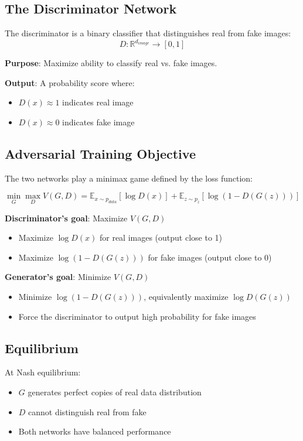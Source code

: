 \documentclass[12pt,a4paper]{article}
\begin{document}
\subsection{The Discriminator Network}

The discriminator is a binary classifier that distinguishes real from fake images:
\[
D: \mathbb{R}^{d_{image}} \to [0, 1]
\]

\textbf{Purpose}: Maximize ability to classify real vs. fake images.

\textbf{Output}: A probability score where:
\begin{itemize}
    \item $D(x) \approx 1$ indicates real image
    \item $D(x) \approx 0$ indicates fake image
\end{itemize}

\subsection{Adversarial Training Objective}

The two networks play a minimax game defined by the loss function:

\begin{equation}
\min_G \max_D V(G, D) = \mathbb{E}_{x \sim p_{data}}[\log D(x)] + \mathbb{E}_{z \sim p_z}[\log(1 - D(G(z)))]
\end{equation}

\textbf{Discriminator's goal}: Maximize $V(G, D)$
\begin{itemize}
    \item Maximize $\log D(x)$ for real images (output close to 1)
    \item Maximize $\log(1 - D(G(z)))$ for fake images (output close to 0)
\end{itemize}

\textbf{Generator's goal}: Minimize $V(G, D)$
\begin{itemize}
    \item Minimize $\log(1 - D(G(z)))$, equivalently maximize $\log D(G(z))$
    \item Force the discriminator to output high probability for fake images
\end{itemize}

\subsection{Equilibrium}

At Nash equilibrium:
\begin{itemize}
    \item $G$ generates perfect copies of real data distribution
    \item $D$ cannot distinguish real from fake
    \item Both networks have balanced performance
\end{itemize}
\end{document}
